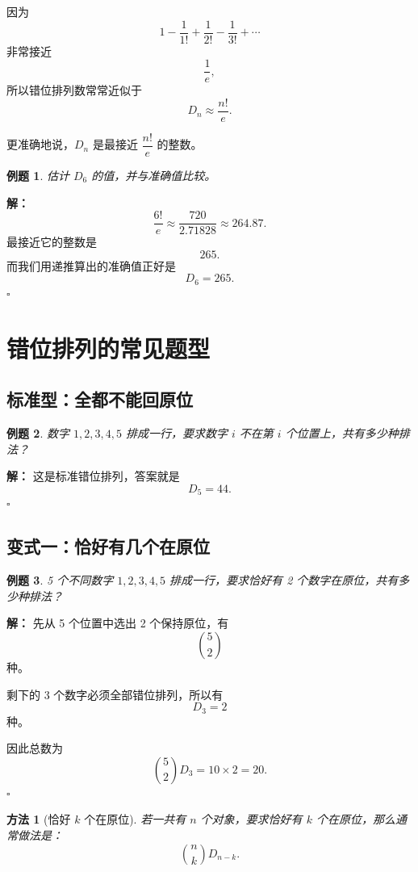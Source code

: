\documentclass[11pt,a4paper,fontset=fandol]{ctexart}
\theoremstyle{formaltheorem}
\newtheorem{method}{方法}[section]
\theoremstyle{formalexample}
\newtheorem{example}{例题}[section]
\newenvironment{solution}{\par\noindent\textbf{解：}}{\hfill$\square$\par}
\newcommand{\Dn}{D_n}
\begin{document}
因为
\[
1-\frac1{1!}+\frac1{2!}-\frac1{3!}+\cdots
\]
非常接近
\[
\frac1e,
\]
所以错位排列数常常近似于
\[
\Dn\approx \frac{n!}{e}.
\]

更准确地说，$\Dn$ 是最接近 $\dfrac{n!}{e}$ 的整数。

\begin{example}
估计 $D_6$ 的值，并与准确值比较。
\end{example}

\begin{solution}
\[
\frac{6!}{e}\approx \frac{720}{2.71828}\approx 264.87.
\]
最接近它的整数是
\[
265.
\]
而我们用递推算出的准确值正好是
\[
D_6=265.
\]
\end{solution}

\section{错位排列的常见题型}

\subsection{标准型：全都不能回原位}

\begin{example}
数字 $1,2,3,4,5$ 排成一行，要求数字 $i$ 不在第 $i$ 个位置上，共有多少种排法？
\end{example}

\begin{solution}
这是标准错位排列，答案就是
\[
D_5=44.
\]
\end{solution}

\subsection{变式一：恰好有几个在原位}

\begin{example}
5 个不同数字 $1,2,3,4,5$ 排成一行，要求恰好有 2 个数字在原位，共有多少种排法？
\end{example}

\begin{solution}
先从 5 个位置中选出 2 个保持原位，有
\[
\binom{5}{2}
\]
种。

剩下的 3 个数字必须全部错位排列，所以有
\[
D_3=2
\]
种。

因此总数为
\[
\binom{5}{2}D_3=10\times 2=20.
\]
\end{solution}

\begin{method}[恰好 $k$ 个在原位]
若一共有 $n$ 个对象，要求恰好有 $k$ 个在原位，那么通常做法是：
\[
\binom{n}{k}D_{n-k}.
\]
\end{method}
\end{document}
